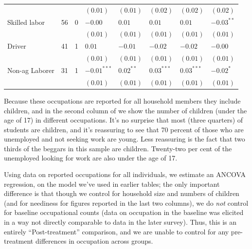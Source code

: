 \documentclass[12pt,letterpaper]{article}
\begin{document}
\begin{table}[htb]
\begin{tabular}{lrrlllll}
 &  &  & \((0.01)\) & \((0.01)\) & \((0.02)\) & \((0.02)\) & \((0.02)\)\\
Skilled labor & 56 & 0 & \(-0.00\) & \(0.01\) & \(0.01\) & \(0.01\) & \(-0.03^{**}\)\\
 &  &  & \((0.01)\) & \((0.01)\) & \((0.01)\) & \((0.01)\) & \((0.01)\)\\
Driver & 41 & 1 & \(0.01\) & \(-0.01\) & \(-0.02\) & \(-0.02\) & \(-0.00\)\\
 &  &  & \((0.01)\) & \((0.01)\) & \((0.01)\) & \((0.01)\) & \((0.01)\)\\
Non-ag Laborer & 31 & 1 & \(-0.01^{***}\) & \(0.02^{**}\) & \(0.03^{***}\) & \(0.03^{***}\) & \(-0.02^{*}\)\\
 &  &  & \((0.01)\) & \((0.01)\) & \((0.01)\) & \((0.01)\) & \((0.01)\)\\
\end{tabular}
\end{table}

Because these occupations are reported for all household members they
include children, and in the second column of  we show
the number of children (under the age of 17) in different occupations.
It's no surprise that most (three quarters) of students are children,
and it's reassuring to see that 70 percent of those who are unemployed
and not seeking work are young.  Less reassuring is the fact that
two thirds of the beggars in this sample are children.  Twenty-two per
cent of the unemployed looking for work are also under the age of 17.

Using data on reported occupations for all individuals, we estimate an
ANCOVA regression, on the model we've used in earlier tables; the only
important difference is that though we control for household size and
numbers of children (and for neediness for figures reported in the
last two columns), we do \emph{not} control for baseline occupational
counts (data on occupation in the baseline was elicited in a way not
directly comparable to data in the later survey).  Thus, this is an
entirely ``Post-treatment'' comparison, and we are unable to control for
any pre-treatment differences in occupation across groups.
\end{document}
